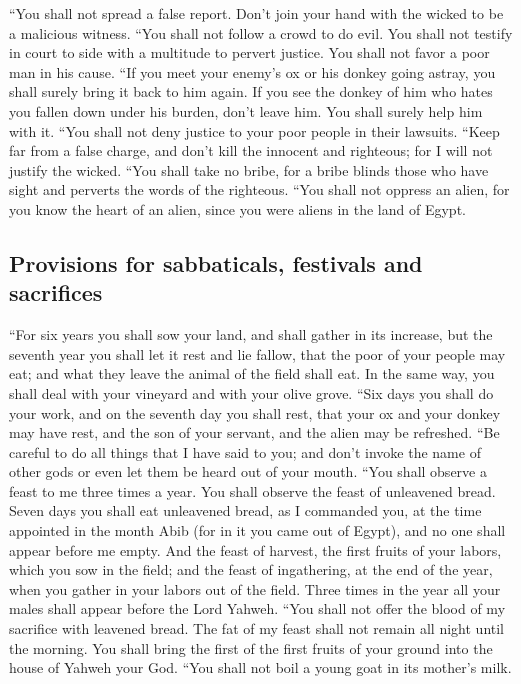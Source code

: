  ``You shall not spread a false report. Don't join your
hand with the wicked to be a malicious witness.  ``You
shall not follow a crowd to do evil. You shall not testify in court to
side with a multitude to pervert justice.  You shall not
favor a poor man in his cause.  ``If you meet your enemy's
ox or his donkey going astray, you shall surely bring it back to him
again.  If you see the donkey of him who hates you fallen
down under his burden, don't leave him. You shall surely help him with
it.  ``You shall not deny justice to your poor people in
their lawsuits.  ``Keep far from a false charge, and don't
kill the innocent and righteous; for I will not justify the wicked.
 ``You shall take no bribe, for a bribe blinds those who
have sight and perverts the words of the righteous.  ``You
shall not oppress an alien, for you know the heart of an alien, since
you were aliens in the land of Egypt.

\hypertarget{provisions-for-sabbaticals-festivals-and-sacrifices}{%
\subsection{Provisions for sabbaticals, festivals and
sacrifices}\label{provisions-for-sabbaticals-festivals-and-sacrifices}}

 ``For six years you shall sow your land, and shall
gather in its increase,  but the seventh year you shall
let it rest and lie fallow, that the poor of your people may eat; and
what they leave the animal of the field shall eat. In the same way, you
shall deal with your vineyard and with your olive grove. 
``Six days you shall do your work, and on the seventh day you shall
rest, that your ox and your donkey may have rest, and the son of your
servant, and the alien may be refreshed.  ``Be careful to
do all things that I have said to you; and don't invoke the name of
other gods or even let them be heard out of your mouth. 
``You shall observe a feast to me three times a year. 
You shall observe the feast of unleavened bread. Seven days you shall
eat unleavened bread, as I commanded you, at the time appointed in the
month Abib (for in it you came out of Egypt), and no one shall appear
before me empty.  And the feast of harvest, the first
fruits of your labors, which you sow in the field; and the feast of
ingathering, at the end of the year, when you gather in your labors out
of the field.  Three times in the year all your males
shall appear before the Lord Yahweh.  ``You shall not
offer the blood of my sacrifice with leavened bread. The fat of my feast
shall not remain all night until the morning.  You shall
bring the first of the first fruits of your ground into the house of
Yahweh your God. ``You shall not boil a young goat in its mother's milk.

